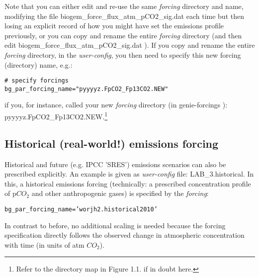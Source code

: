 \documentclass[11pt,fleqn]{book} %
\begin{document}
Note that you can either edit and re-use the same \textit{forcing} directory and name, modifying the file \footnotesize\textsf{biogem\_force\_flux\_atm\_pCO2\_sig.dat }\normalsize each time but then losing an explicit record of how you might have set the emissions profile previously, or you can copy and rename the entire \textit{forcing} directory (and then edit \footnotesize\textsf{biogem\_force\_flux\_atm\_pCO2\_sig.dat }\normalsize). If you copy and rename the entire \textit{forcing} directory, in the \textit{user-config}, you then need to specify this new forcing (directory) name, e.g.:
\vspace{-2pt}\begin{verbatim}
# specify forcings
bg_par_forcing_name="pyyyyz.FpCO2_Fp13CO2.NEW"
\end{verbatim}\vspace{-2pt}
if you, for instance, called your new \textit{forcing} directory (in \footnotesize\textsf{genie-forcings }\normalsize): \footnotesize\textsf{pyyyyz.FpCO2\_Fp13CO2.NEW}\normalsize.\footnote{Refer to the directory map in Figure 1.1. if in doubt here.}

\vspace{20pt}


\newpage
\subsection{Historical (real-world!) emissions forcing}

Historical and future (e.g. IPCC 'SRES') emissions scenarios can also be prescribed explicitly. An example is given as \textit{user-config} file: \textsf{\footnotesize LAB\_3.historical}. In this, a historical emissions forcing (technically: a prescribed concentration profile of p\(CO_{2}\) and other anthropogenic gases) is specified by the \textit{forcing}:
\vspace{-2pt}\begin{verbatim}
bg_par_forcing_name=’worjh2.historical2010’
\end{verbatim}\vspace{-2pt}
In contrast to before, no additional scaling is needed because the forcing specification directly follows the observed change in atmospheric concentration with time (in units of atm \(CO_{2}\)).
\end{document}
